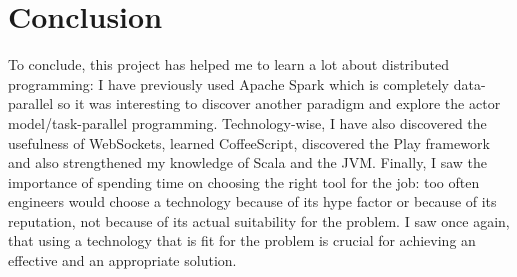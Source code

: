 \documentclass[titlepage]{article}
\begin{document}
\section{Conclusion}
To conclude, this project has helped me to learn a lot about distributed programming: I have previously used Apache Spark which is completely data-parallel so it was interesting to discover another paradigm and explore the actor model/task-parallel programming. Technology-wise, I have also discovered the usefulness of WebSockets, learned CoffeeScript, discovered the Play framework and also strengthened my knowledge of Scala and the JVM. Finally, I saw the importance of spending time on choosing the right tool for the job: too often engineers would choose a technology because of its hype factor or because of its reputation, not because of its actual suitability for the problem. I saw once again, that using a technology that is fit for the problem is crucial for achieving an effective and an appropriate solution. 
\end{document}
